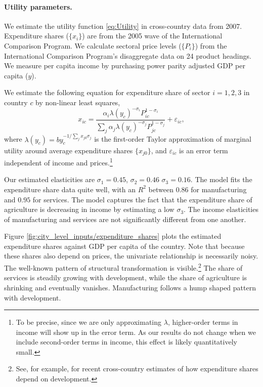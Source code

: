 \documentclass[12pt]{article}
\begin{document}
\paragraph{Utility parameters.}
We estimate the utility function \eqref{eq:Utility} in cross-country data from 2007. Expenditure shares ($\{x_i\}$) are from the 2005 wave of the International Comparison Program. We calculate sectoral price levels ($\{P_i\}$) from the International Comparison Program's disaggregate data on 24 product headings. We measure per capita income by purchasing power parity adjusted GDP per capita ($y$).

We estimate the following equation for expenditure share of sector $i=1,2,3$ in country $c$ by non-linear least squares,
\begin{equation}\label{eq:estimable:utility}
	x_{ic} =
	\frac 	{\alpha_i \lambda(y_c)^{-\sigma_i}  P_{ic}^{1-\sigma_i}}
			{\sum_j {\alpha_j \lambda(y_c)^{-\sigma_j}  P_{jc}^{1-\sigma_j}}}
	+ \varepsilon_{ic},
\end{equation}
where $\lambda(y_c) = by_c^{-1/\sum_j x_{j0}\sigma_j}$ is the first-order Taylor approximation of marginal utility around average expenditure shares $\{x_{j0}\}$, and $\varepsilon_{ic}$ is an error term independent of income and prices.\footnote{To be precise, since we are only approximating $\lambda$, higher-order terms in income will show up in the error term. As our results do not change when we include second-order terms in income, this effect is likely quantitatively small.}

Our estimated elasticities are $\sigma_1=0.45$, $\sigma_2=0.46$ $\sigma_3=0.16$. The model fits the expenditure share data quite well, with an $R^2$ between $0.86$ for manufacturing and $0.95$ for services. The model captures the fact that the expenditure share of agriculture is decreasing in income by estimating a low $\sigma_3$. The income elasticities of manufacturing and services are not significantly different from one another. 

Figure \ref{fig:city_level_inputs/expenditure_shares} plots the estimated expenditure shares against GDP per capita of the country. Note that because these shares also depend on prices, the univariate relationship is necessarily noisy. The well-known pattern of structural transformation is visible.\footnote{See, for example,  for recent cross-country estimates of how expenditure shares depend on development.} The share of services is steadily growing with development, while the share of agriculture is shrinking and eventually vanishes. Manufacturing follows a hump shaped pattern with development.
\end{document}
